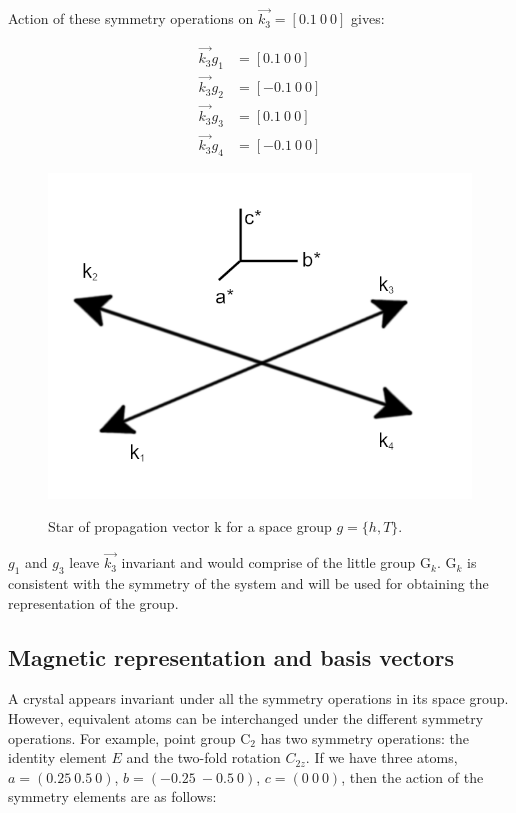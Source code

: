\documentclass[10pt,doublespacing,edeposit]{uiucthesis2020}
\begin{document}
\begin{mainmatter}
Action of these symmetry operations on $\vec{k_3} = [0.1\ 0\ 0]$ gives:

\begin{align*}
\vec{k_3}g_1 &= [0.1\ 0\ 0]\\
\vec{k_3}g_2 &= [-0.1\ 0\ 0]\\
\vec{k_3}g_3 &= [0.1\ 0\ 0]\\
\vec{k_3}g_4 &= [-0.1\ 0\ 0]
\end{align*}

\begin{figure}
\centering\includegraphics[width=0.5\columnwidth]{figures/ch4/k-star.png} \\
\caption{\label{fig:star}
Star of propagation vector k for a space group $g = \{h,T\}$.
}
\end{figure}

$g_1$ and $g_3$ leave $\vec{k_3}$ invariant and would comprise of the little group G$_k$. G$_k$ is consistent with the symmetry of the system and will be used for obtaining the representation of the group.

\subsection{Magnetic representation and basis vectors}


A crystal appears invariant under all the symmetry operations in its space group. However, equivalent atoms can be interchanged under the different symmetry operations. For example, point group C$_2$ has two symmetry operations: the identity element $E$ and the two-fold rotation $C_{2z}$. If we have three atoms, $a = (0.25\ 0.5\ 0)$, $b = (-0.25\ -0.5\ 0)$, $c = (0\ 0\ 0)$, then the action of the symmetry elements are as follows:


\end{mainmatter}
\end{document}

